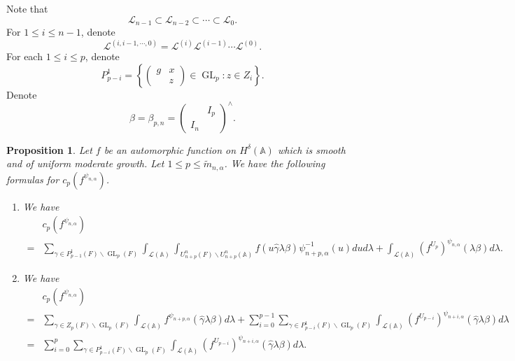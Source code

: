\documentclass[12pt]{amsart}
\newcommand{\A}{\mathbb{A}}
\newcommand{\wt}{\widetilde}
\newtheorem{proposition}[theorem]{Proposition}%
\theoremstyle{remark}
\DeclareMathOperator{\GL}{GL}
\begin{document}
Note that
\begin{equation*}
\mathcal{L}_{n-1}\subset \mathcal{L}_{n-2} \subset \cdots \subset \mathcal{L}_{0}.
\end{equation*}
For $1\le i \le n-1$, denote
\begin{equation*}
\mathcal{L}^{(i,i-1, \cdots, 0)}= \mathcal{L}^{(i)} \mathcal{L}^{(i-1)}  \cdots  \mathcal{L}^{(0)}.
\end{equation*}
For each $1\le i \le p$, denote 
\begin{equation*}
P_{p-i}^1=	\left\{ \begin{pmatrix} g & x\\& z\end{pmatrix}\in \GL_p: z\in Z_i \right\}.
\end{equation*}
Denote
\begin{equation*}
	\beta =\beta_{p,n}= \begin{pmatrix} &I_p \\ I_n &\end{pmatrix}^\wedge . 
\end{equation*}




\begin{proposition}
\label{prop-ConstantTerm-prop1}
Let $f$ be an automorphic function on $H^{\delta}(\A)$ which is smooth and of uniform moderate growth. Let $1\le p \le \wt m_{n,\alpha}$. We have the following formulas for $c_p(f^{\psi_{n,\alpha}})$.
\begin{enumerate}
\item We have
\begin{equation}
\label{eq-prop-ConstantTerm-prop1}
\begin{split}
&c_p(f^{\psi_{n,\alpha}})\\
=&\sum_{\gamma\in P_{p-1}^1(F)\backslash \GL_p(F)} \int_{\mathcal{L}(\A)} \int_{U_{n+p}^n(F)\backslash U_{n+p}^n(\A)} f(u\hat{\gamma}  \lambda \beta) \psi_{n+p,\alpha}^{-1}(u)dud\lambda+ \int_{\mathcal{L}(\A)} (f^{U_p})^{\psi_{n,\alpha}}(\lambda \beta) d\lambda. 
\end{split}
\end{equation}

\item We have
\begin{equation}
\label{eq-prop-ConstantTerm-prop1-2}
\begin{split}
&c_p(f^{\psi_{n,\alpha}})\\
=&\sum_{\gamma\in Z_p(F)\backslash \GL_p(F)} \int_{\mathcal{L}(\A)}   f^{\psi_{n+p,\alpha}}(  \hat{\gamma}  \lambda \beta) d\lambda+ \sum_{i=0}^{p-1} \sum_{\gamma\in P_{p-i}^1(F)\backslash \GL_p(F)}  \int_{\mathcal{L}(\A)} (f^{U_{p-i}})^{\psi_{n+i,\alpha}}(\hat{\gamma} \lambda \beta) d\lambda \\
=&\sum_{i=0}^{p} \sum_{\gamma\in P_{p-i}^1(F)\backslash \GL_p(F)}  \int_{\mathcal{L}(\A)} (f^{U_{p-i}})^{\psi_{n+i,\alpha}}(\hat{\gamma} \lambda \beta) d\lambda .
\end{split}
\end{equation}
\end{enumerate}
\end{proposition}
\end{document}
